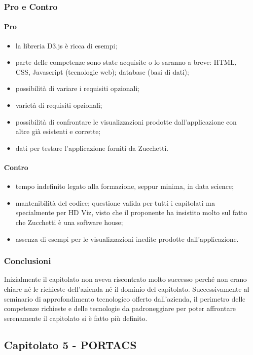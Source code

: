 \subsubsection{Pro e Contro}
\paragraph*{Pro}
\begin{itemize}
\item la libreria D3.js è ricca di esempi;
\item parte delle competenze sono state acquisite o lo saranno a breve: HTML, CSS, Javascript (tecnologie web); database (basi di dati);
\item possibilità di variare i requisiti opzionali;
\item varietà di requisiti opzionali;
\item possibilità di confrontare le visualizzazioni prodotte dall'applicazione con altre già esistenti e corrette;
\item dati per testare l'applicazione forniti da Zucchetti.
\end{itemize}
\paragraph*{Contro}
\begin{itemize}
	\item tempo indefinito legato alla formazione, seppur minima, in data science;
	\item mantenibilità del codice; questione valida per tutti i capitolati ma specialmente per HD Viz, visto che il proponente ha insistito molto sul fatto che Zucchetti è una software house;
	\item assenza di esempi per le visualizzazioni inedite prodotte dall'applicazione. 
\end{itemize}
\subsubsection{Conclusioni}
Inizialmente il capitolato non aveva riscontrato molto successo perché non erano chiare né le richieste dell'azienda né il dominio del capitolato. Successivamente al seminario di approfondimento tecnologico offerto dall'azienda, il perimetro delle competenze richieste e delle tecnologie da padroneggiare per poter affrontare serenamente il capitolato si è fatto più definito.

\subsection{Capitolato 5 - PORTACS}
